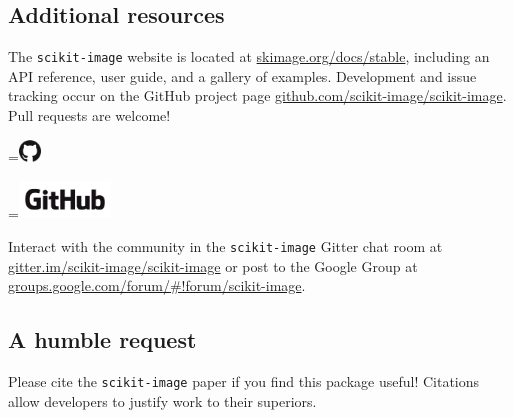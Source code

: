 \documentclass[nohyper, %
               ]{tufte-handout}
\DeclareRobustCommand{\ski}{\texttt{scikit-image}\xspace}
\newcommand*{\vcenteredhbox}[1]{\begingroup
\setbox0=\hbox{#1}\parbox{\wd0}{\box0}\endgroup}
\begin{document}
\subsection{Additional resources} %
  \label{sub:additional_resources}
  The \ski website is located at \url{skimage.org/docs/stable}, including an API reference, user guide, and a gallery of examples. Development and issue tracking occur on the GitHub project page \url{github.com/scikit-image/scikit-image}. Pull requests are welcome!\\\medskip
  \begin{marginfigure}[-1.7cm]%
    \centering%
    \begingroup
      \vcenteredhbox{\includegraphics[height=0.59cm]{GitHub-Mark-large.png}}%
      \vcenteredhbox{\includegraphics[height=1cm]{GitHub-Logo.png}}%
    \endgroup
    \label{fig:GitHub}%
  \end{marginfigure}%
  \noindent
  Interact with the community in the \ski Gitter chat room at \url{gitter.im/scikit-image/scikit-image} or post to the Google Group at \url{groups.google.com/forum/#!forum/scikit-image}.

\subsection{A humble request} %
  \label{sub:a_humble_request}
  Please cite the \ski paper\cite{van2014scikit} if you find this package useful! Citations allow developers to justify work to their superiors.

\newpage%
\end{document}
